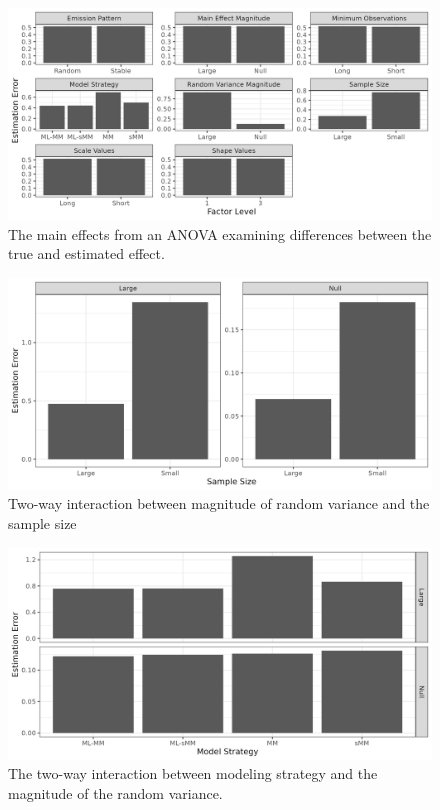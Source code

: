 \documentclass[12pt]{./styles/outhesis}
\begin{document}
\begin{figure}
\includegraphics[width=15cm]{figures/anova1MainEffect.png}
\caption{The main effects from an ANOVA examining differences between
the true and estimated effect.}
\end{figure}

\begin{figure}
\centering
\includegraphics[width=15cm]{figures/anova1TwoWay2.png}
\caption{Two-way interaction between magnitude of random variance and
the sample size}
\end{figure}

\begin{figure}
\centering
\includegraphics[width=13cm]{figures/anova1TwoWay1.png}
\caption{The two-way interaction between modeling strategy and the
magnitude of the random variance.}
\end{figure}
\end{document}
